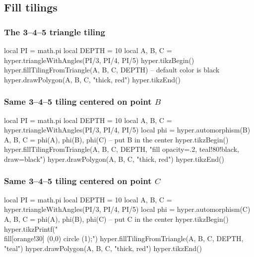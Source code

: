 \documentclass{article}
\begin{document}
\subsection{Fill tilings}

\subsubsection{The 3--4--5 triangle tiling}
\begin{codeandresult}
\begin{luacode*}
local PI = math.pi
local DEPTH = 10
local A, B, C = hyper.triangleWithAngles(PI/3, PI/4, PI/5)
hyper.tikzBegin()
hyper.fillTilingFromTriangle(A, B, C, DEPTH)
-- default color is black
hyper.drawPolygon(A, B, C, "thick, red")
hyper.tikzEnd()
\end{luacode*}
\end{codeandresult}

\subsubsection{Same 3--4--5 tiling centered on point $B$}
\begin{codeandresult}
\begin{luacode*}
local PI = math.pi
local DEPTH = 10
local A, B, C = hyper.triangleWithAngles(PI/3, PI/4, PI/5)
local phi = hyper.automorphism(B)
A, B, C = phi(A), phi(B), phi(C) -- put B in the center
hyper.tikzBegin()
hyper.fillTilingFromTriangle(A, B, C, DEPTH, "fill opacity=.2, teal!80!black, draw=black")
hyper.drawPolygon(A, B, C, "thick, red")
hyper.tikzEnd()
\end{luacode*}
\end{codeandresult}

\subsubsection{Same 3--4--5 tiling centered on point $C$}
\begin{codeandresult}
\begin{luacode*}
local PI = math.pi
local DEPTH = 10
local A, B, C = hyper.triangleWithAngles(PI/3, PI/4, PI/5)
local phi = hyper.automorphism(C)
A, B, C = phi(A), phi(B), phi(C) -- put C in the center
hyper.tikzBegin()
hyper.tikzPrintf("\\fill[orange!30] (0,0) circle (1);")
hyper.fillTilingFromTriangle(A, B, C, DEPTH, "teal")
hyper.drawPolygon(A, B, C, "thick, red")
hyper.tikzEnd()
\end{luacode*}
\end{codeandresult}
\end{document}
